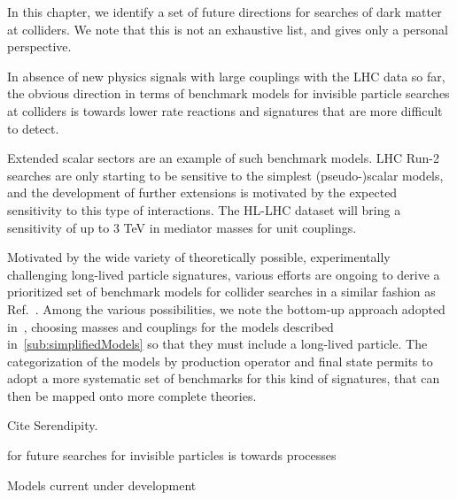 In this chapter, we identify a set of future directions for searches of dark matter at colliders. 
We note that this is not an exhaustive list, and gives only a personal perspective. 



In absence of new physics signals with large couplings with the LHC data so far, the obvious direction 
in terms of benchmark models for invisible particle searches at colliders is towards lower rate reactions
and signatures that are more difficult to detect. 

Extended scalar sectors are an example of such benchmark models. LHC Run-2 searches are only starting to be sensitive to the simplest (pseudo-)scalar models, and the development of further extensions is motivated by the expected sensitivity to this type of interactions. The HL-LHC dataset will bring a sensitivity of up to 3 TeV in mediator masses for unit couplings. 

Motivated by the wide variety of theoretically possible, experimentally challenging long-lived particle signatures, various efforts are ongoing to derive a prioritized set of benchmark models for collider searches in a similar fashion as Ref.~\cite{Abercrombie:2015wmb}. 
Among the various possibilities, we note the bottom-up approach adopted in~\cite{Buchmueller:2017uqu}, choosing masses and couplings for the models described in~\ref{sub:simplifiedModels} so that they must include a long-lived particle. 
The categorization of the models by production operator and final state permits to adopt a more systematic set of benchmarks for this kind of signatures, that can then be mapped onto more complete theories. 

Cite Serendipity. 

for future searches for invisible particles is towards processes 

Models current under development 

